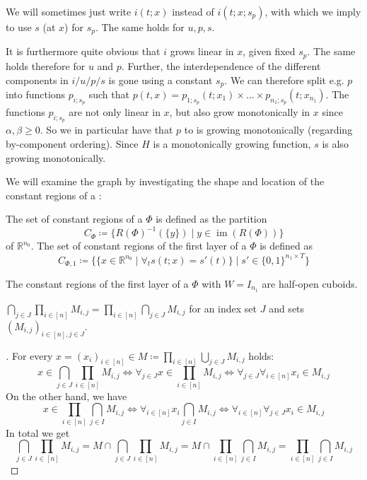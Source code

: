\begin{remark}\label{rem:regions-non-recursive-defs}
  We will sometimes just write \(i(t;x)\) instead of \(i(t;x;s_p)\), with which we imply to use \(s\) (at \(x\)) for \(s_p\). The same holds for \(u,p,s\).

  It is furthermore quite obvious that \(i\) grows linear in \(x\), given fixed \(s_p\). The same holds therefore for \(u\) and \(p\). Further, the interdependence of the different components in \(i/u/p/s\) is gone using a constant \(s_p\). We can therefore split e.g. \(p\) into functions \(p_{i;s_p}\) such that \(p(t,x)=p_{1;s_p}(t;x_1)×…×p_{n_1;s_p}(t;x_{n_1})\).
  The functions \(p_{i;s_p}\) are not only linear in \(x\), but also grow monotonically in \(x\) since \(α,β≥0\).
  So we in particular have that \(p\) to is growing monotonically (regarding by-component ordering).
  Since \(H\) is a monotonically growing function, \(s\) is also growing monotonically.
\end{remark}
We will examine the graph by investigating the shape and location of the constant regions of a \rdtlifsnn:

\begin{definition}
  The set of constant regions of a \rdtlifsnn \(Φ\) is defined as the partition
  \[ C_Φ≔\{R(Φ)^{-1}(\{y\})\mid y∈\operatorname{im}(R(Φ))\} \]
  of \(ℝ^{n_0}\). The set of constant regions of the first layer of a \rdtlifsnn \(Φ\) is defined as
  \[ C_{Φ,1}≔\{\{x∈ℝ^{n_0}\mid∀_ts(t;x)=s'(t)\}\mid s'∈\{0,1\}^{n_1×T}\} \]
\end{definition}


\begin{proposition}\label{prop:const-regions-cuboids}
  The constant regions of the first layer of a \rdtlifsnn \(Φ\) with \(W=I_{n_1}\) are half-open cuboids.
\end{proposition}

\begin{lemma}\label{lem:intersection-and-product}
  \(\bigcap_{j∈J}\prod_{i∈[n]}M_{i,j}=\prod_{i∈[n]}\bigcap_{j∈J}M_{i,j}\) for an index set \(J\) and sets \((M_{i,j})_{i∈[n],j∈J}\).
\end{lemma}

\begin{proof}[]
  For every \(x=(x_i)_{i∈[n]}∈M≔\prod_{i∈[n]}\bigcup_{j∈J}M_{i,j}\) holds:
  \begin{equation*}
   x∈\bigcap_{j∈J}\prod_{i∈[n]}M_{i,j}⇔∀_{j∈J}x∈\prod_{i∈[n]}M_{i,j} ⇔∀_{j∈J}∀_{i∈[n]}x_i∈M_{i,j}
  \end{equation*}
  On the other hand, we have
  \begin{equation*}
    x∈\prod_{i∈[n]}\bigcap_{j∈I}M_{i,j}⇔∀_{i∈[n]}x_i\bigcap_{j∈I}M_{i,j}⇔∀_{i∈[n]}∀_{j∈J}x_i∈M_{i,j}
  \end{equation*}
  In total we get
  \[ \bigcap_{j∈J}\prod_{i∈[n]}M_{i,j}=M∩\bigcap_{j∈J}\prod_{i∈[n]}M_{i,j}=M∩\prod_{i∈[n]}\bigcap_{j∈I}M_{i,j}=\prod_{i∈[n]}\bigcap_{j∈I}M_{i,j} \]
\end{proof}

